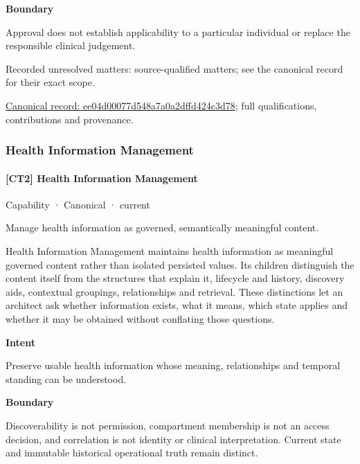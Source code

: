 \textbf{Boundary}



Approval does not establish applicability to a particular individual or replace the responsible clinical judgement.


{\small Recorded unresolved matters: source-qualified matters; see the canonical record for their exact scope.}\par
{\footnotesize \href{../../../../continuum/strategy/capability/ee04d00077d548a7a0a2dffd424c3d78.md}{Canonical record: ee04d00077d548a7a0a2dffd424c3d78}; full qualifications, contributions and provenance.}\par
\subsubsection{Health Information Management}

\paragraph{[CT2] Health Information Management}

\label{element:eb2984f0ca79420e83012f9e06a005fb}
{\small Capability · Canonical · current}\par

Manage health information as governed, semantically meaningful content.



Health Information Management maintains health information as meaningful governed content rather than isolated persisted values. Its children distinguish the content itself from the structures that explain it, lifecycle and history, discovery aids, contextual groupings, relationships and retrieval. These distinctions let an architect ask whether information exists, what it means, which state applies and whether it may be obtained without conflating those questions.



\textbf{Intent}



Preserve usable health information whose meaning, relationships and temporal standing can be understood.



\textbf{Boundary}



Discoverability is not permission, compartment membership is not an access decision, and correlation is not identity or clinical interpretation. Current state and immutable historical operational truth remain distinct.


